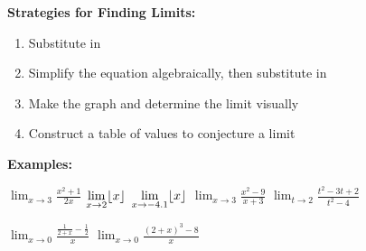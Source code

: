 \documentclass[addpoints, 12pt]{exam}
\DeclarePairedDelimiter\floor{\lfloor}{\rfloor}
\begin{document}
\noindent\textbf{Strategies for Finding Limits:}
\begin{enumerate}
    \item Substitute in
    \item Simplify the equation algebraically, then substitute in
    \item Make the graph and determine the limit visually
    \item Construct a table of values to conjecture a limit
\end{enumerate}
\noindent\textbf{Examples:}
\begin{questions}
    \question $\displaystyle\lim_{x\to3}\frac{x^2+1}{2x}$ 
    \question $\displaystyle\lim_{x\to2}\floor*{x}$ 
    \question $\displaystyle\lim_{x\to-4.1}\floor*{x}$ 
    \question $\displaystyle\lim_{x\to3}\frac{x^2-9}{x+3}$ 
    \question $\displaystyle\lim_{t\to2}\frac{t^2-3t+2}{t^2-4}$ 

\newpage

    \question $\displaystyle\lim_{x\to0}\frac{\frac{1}{2+x}-\frac{1}{2}}{x}$ 
    \question $\displaystyle\lim_{x\to0}\frac{(2+x)^3-8}{x}$ 
\end{questions}

\end{document}
